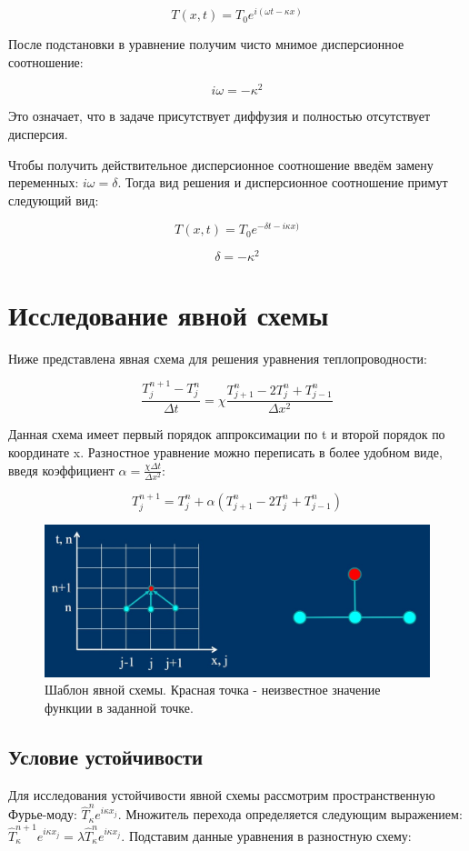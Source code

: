 \documentclass[diploma]{nanolab2015}
\begin{document}
$$T(x,t) = T_0 e^{i(\omega t - \kappa x)}$$

После подстановки в уравнение получим чисто мнимое дисперсионное соотношение:

$$i \omega = -\kappa ^2$$

Это означает, что в задаче присутствует диффузия и полностью отсутствует дисперсия.

Чтобы получить действительное дисперсионное соотношение введём замену переменных: $i \omega = \delta$. Тогда вид решения и  дисперсионное соотношение примут следующий вид:

$$T(x,t) = T_0 e^{-\delta t - i \kappa x)}$$

$$\delta = - \kappa^2$$

\section{Исследование явной схемы}
Ниже представлена явная схема для решения уравнения теплопроводности:

$$\frac{T^{n+1}_{j}-T^{n}_{j}}{\Delta t}=\chi \frac{T^{n}_{j+1}-2T^{n}_{j}+T^{n}_{j-1}}{\Delta x^2}$$

Данная схема имеет первый порядок аппроксимации по t и второй порядок по координате x. Разностное уравнение можно переписать в более удобном виде, введя коэффициент $\alpha = \frac{\chi \Delta t}{\Delta x^2}$:

$$T^{n+1}_{j} = T^{n}_{j} + \alpha (T^{n}_{j+1} -2T^{n}_{j}+T^{n}_{j-1})$$

\begin{figure}[h!]
\centering
\includegraphics[scale=0.5]{scheme1.jpg}
\caption{\label{pic1}  Шаблон явной схемы. Красная точка - неизвестное значение функции в заданной точке. }
\end{figure}

\subsection{Условие устойчивости}
Для исследования устойчивости явной схемы рассмотрим пространственную Фурье-моду: $\hat{T}^n_\kappa e^{i \kappa x_j}$. Множитель перехода определяется следующим выражением: $\hat{T}^{n+1}_\kappa e^{i \kappa x_j}=\lambda \hat{T}^n_\kappa e^{i \kappa x_j}$. Подставим данные уравнения в разностную схему:
\end{document}
